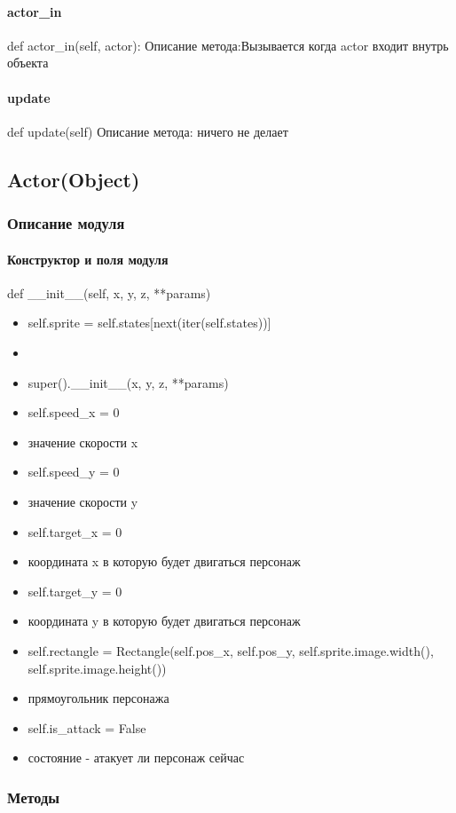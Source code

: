 \paragraph{actor\_in}
 def actor\_in(self, actor):
Описание метода:Вызывается когда actor входит внутрь объекта
\paragraph{update}
def update(self)
Описание метода: ничего не делает

\subsection{Actor(Object)}
\subsubsection{Описание модуля}
\paragraph{Конструктор и поля модуля}
def \_\_init\_\_(self, x, y, z, **params)
\begin{itemize}
	\item self.sprite = self.states[next(iter(self.states))]
	\item
	\item super().\_\_init\_\_(x, y, z, **params)
	\item self.speed\_x = 0 
	\item значение скорости x
	\item self.speed\_y = 0  
	\item значение скорости y
	\item self.target\_x = 0
	\item координата x в которую будет двигаться персонаж
	\item self.target\_y = 0
	\item координата y в которую будет двигаться персонаж
	\item self.rectangle = Rectangle(self.pos\_x, self.pos\_y, self.sprite.image.width(), self.sprite.image.height())
	\item прямоугольник персонажа
	\item self.is\_attack = False
	\item состояние - атакует ли персонаж сейчас
\end{itemize}
\subsubsection{Методы}
